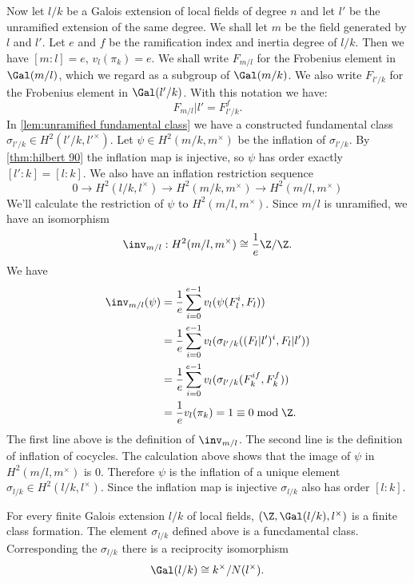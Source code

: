 Now let $l/k$ be a Galois extension of local fields of degree $n$ and let $l'$ be
the unramified extension of the same degree.
We shall let $m$ be the field generated by $l$ and $l'$.
Let $e$ and $f$ be the ramification index and inertia degree of $l/k$.
Then we have $[m:l] = e$, $v_l(\pi_k)= e$.
We shall write $F_{m/l}$ for the Frobenius element in $\Gal(m/l)$, which we regard as a subgroup
of $\Gal(m/k)$. We also write $F_{l'/k}$ for the Frobenius element in $\Gal(l'/k)$.
With this notation we have:
\[
	F_{m/l}|l' = F_{l'/k}^f.
\]
In \ref{lem:unramified fundamental class} we have a constructed fundamental class
$\sigma_{l'/k} \in H^2(l'/k,l'^\times)$.
Let $\psi\in H^2(m/k,m^\times)$ be the inflation of $\sigma_{l'/k}$.
By \ref{thm:hilbert 90} the inflation map is injective,
so $\psi$ has order exactly $[l':k] = [l:k]$.
We also have an inflation restriction sequence
\[
	0 \to H^2(l/k, l^\times) \to H^2(m/k , m^\times) \to H^2(m/l, m^\times)
\]
We'll calculate the restriction of $\psi$ to $H^2(m/l, m^\times)$.
Since $m/l$ is unramified, we have an isomorphism
\[
	\inv_{m/l} : H^2(m/l, m^\times) \cong \frac{1}{e}\Z/ \Z.
\]
We have
\begin{align*}
	\inv_{m/l}(\psi)
	&=\frac{1}{e} \sum_{i=0}^{e-1} v_l (\psi (F_l^i,F_l))\\
	&=\frac{1}{e} \sum_{i=0}^{e-1} v_l (\sigma_{l'/k}((F_l|l')^i,F_l|l'))\\
	&=\frac{1}{e} \sum_{i=0}^{e-1} v_l (\sigma_{l'/k}(F_k^{if},F_k^f))\\
	&=\frac{1}{e} v_l (\pi_k) = 1 \equiv 0 \bmod \Z.
\end{align*}
The first line above is the definition of $\inv_{m/l}$.
The second line is the definition of inflation of cocycles.
The calculation above shows that the image of $\psi$ in $H^2(m/l, m^\times)$ is $0$.
Therefore $\psi$ is the inflation of a unique element $\sigma_{l/k} \in H^2(l/k,l^\times)$.
Since the inflation map is injective $\sigma_{l/k}$ also has order $[l:k]$.

\begin{theorem} \label{thm:local fund class}
	For every finite Galois extension $l/k$ of local fields, $(\Z,\Gal(l/k),l^\times)$ is a finite
	class formation. The element $\sigma_{l/k}$ defined above is a funcdamental class.
	Corresponding the $\sigma_{l/k}$ there is a reciprocity isomorphism
	\[
		\Gal(l/k) \cong k^\times / N(l^\times).
	\]
\end{theorem}

